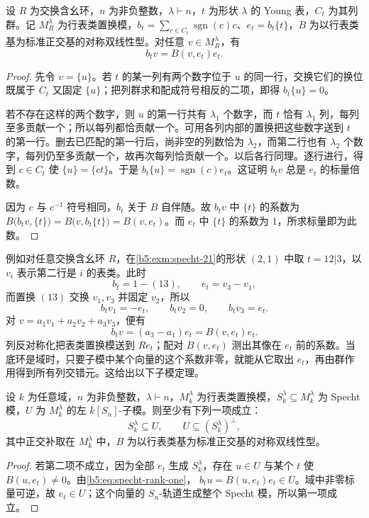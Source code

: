\begin{lemma}\label{b5:lem:specht-rank-one}
	设 \(R\) 为交换含幺环，\(n\) 为非负整数，\(\lambda\vdash n\)，\(t\) 为形状 \(\lambda\) 的 Young 表，\(C_t\) 为其列群。记 \(M_R^\lambda\) 为行表类置换模，\(b_t=\sum_{c\in C_t}\operatorname{sgn}(c)c\)、\(e_t=b_t\{t\}\)，\(B\) 为以行表类基为标准正交基的对称双线性型。对任意 \(v\in M_R^\lambda\)，有
	\begin{equation}\label{b5:eq:specht-rank-one}
		b_tv=B(v,e_t)e_t.
	\end{equation}
\end{lemma}
\begin{proof}
	先令 \(v=\{u\}\)。若 \(t\) 的某一列有两个数字位于 \(u\) 的同一行，交换它们的换位既属于 \(C_t\) 又固定 \(\{u\}\)；把列群求和配成符号相反的二项，即得 \(b_t\{u\}=0\)。

	若不存在这样的两个数字，则 \(u\) 的第一行共有 \(\lambda_1\) 个数字，而 \(t\) 恰有 \(\lambda_1\) 列，每列至多贡献一个；所以每列都恰贡献一个。可用各列内部的置换把这些数字送到 \(t\) 的第一行。删去已匹配的第一行后，尚非空的列数恰为 \(\lambda_2\)，而第二行也有 \(\lambda_2\) 个数字，每列仍至多贡献一个，故再次每列恰贡献一个。以后各行同理。逐行进行，得到 \(c\in C_t\) 使 \(\{u\}=\{ct\}\)。于是 \(b_t\{u\}=\operatorname{sgn}(c)e_t\)。这证明 \(b_tv\) 总是 \(e_t\) 的标量倍数。

	因为 \(c\) 与 \(c^{-1}\) 符号相同，\(b_t\) 关于 \(B\) 自伴随。故 \(b_tv\) 中 \(\{t\}\) 的系数为 \(B\bigl(b_tv,\{t\}\bigr)=B\bigl(v,b_t\{t\}\bigr)=B(v,e_t)\)。而 \(e_t\) 中 \(\{t\}\) 的系数为 \(1\)，所求标量即为此数。
\end{proof}

例如对任意交换含幺环 \(R\)，在\cref{b5:exm:specht-21}的形状 \((2,1)\) 中取 \(t=12|3\)，以 \(v_i\) 表示第二行是 \(i\) 的表类。此时
\[
	b_t=1-(13),\qquad e_t=v_3-v_1,
\]
而置换 \((13)\) 交换 \(v_1,v_3\) 并固定 \(v_2\)，所以
\[
	b_tv_1=-e_t,\qquad b_tv_2=0,\qquad b_tv_3=e_t.
\]
对 \(v=a_1v_1+a_2v_2+a_3v_3\)，便有
\[
	b_tv=(a_3-a_1)e_t=B(v,e_t)e_t.
\]
列反对称化把表类置换模送到 \(Re_t\)；配对 \(B(v,e_t)\) 测出其像在 \(e_t\) 前的系数。当底环是域时，只要子模中某个向量的这个系数非零，就能从它取出 \(e_t\)，再由群作用得到所有列交错元。这给出以下子模定理。

\begin{theorem}[子模定理]\label{b5:thm:specht-submodule}
	设 \(k\) 为任意域，\(n\) 为非负整数，\(\lambda\vdash n\)，\(M_k^\lambda\) 为行表类置换模，\(S_k^\lambda\subseteq M_k^\lambda\) 为 Specht 模，\(U\) 为 \(M_k^\lambda\) 的左 \(k[S_n]\)-子模。则至少有下列一项成立：
	\[
		S_k^\lambda\subseteq U,\qquad U\subseteq(S_k^\lambda)^\perp,
	\]
	其中正交补取在 \(M_k^\lambda\) 中，\(B\) 为以行表类基为标准正交基的对称双线性型。
\end{theorem}
\begin{proof}
	若第二项不成立，因为全部 \(e_t\) 生成 \(S_k^\lambda\)，存在 \(u\in U\) 与某个 \(t\) 使 \(B(u,e_t)\ne0\)。由\eqref{b5:eq:specht-rank-one}， \(b_tu=B(u,e_t)e_t\in U\)。域中非零标量可逆，故 \(e_t\in U\)；这个向量的 \(S_n\)-轨道生成整个 Specht 模，所以第一项成立。
\end{proof}

